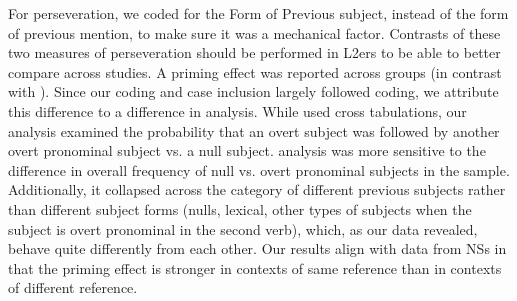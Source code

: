 \documentclass[output=paper,colorlinks,citecolor=brown,draftmode]{langscibook}
\begin{document}
For perseveration, we coded for the Form of Previous subject, instead of the form of previous mention, to make sure it was a mechanical factor. Contrasts of these two measures of perseveration should be performed in L2ers to be able to better compare across studies. A priming effect was reported across groups (in contrast with \citealp{Otheguy2015}). Since our coding and case inclusion largely followed  coding, we attribute this difference to a difference in analysis. While \citet{Otheguy2015} used cross tabulations, our analysis examined the probability that an overt subject was followed by another overt pronominal subject vs. a null subject.  analysis was more sensitive to the difference in overall frequency of null vs. overt pronominal subjects in the sample. Additionally, it collapsed across the category of different previous subjects rather than different subject forms (nulls, lexical, other types of subjects when the subject is overt pronominal in the second verb), which, as our data revealed, behave quite differently from each other. Our results align with  data from NSs in that the priming effect is stronger in contexts of same reference than in contexts of different reference.
\end{document}
